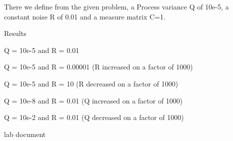 \documentclass{article}
\begin{document}
    There we define from the given problem, a Process variance Q of 10e-5, a constant noise R of 0.01 and a measure matrix C=1.

    Results

    Q = 10e-5 and R = 0.01

    Q = 10e-5 and R = 0.00001 (R increased on a factor of 1000)

    Q = 10e-5 and R = 10 (R decreased on a factor of 1000)

    Q = 10e-8 and R = 0.01 (Q increased on a factor of 1000)

    Q = 10e-2 and R = 0.01 (Q decreased on a factor of 1000)

   

    
    

    lab document
\end{document}
